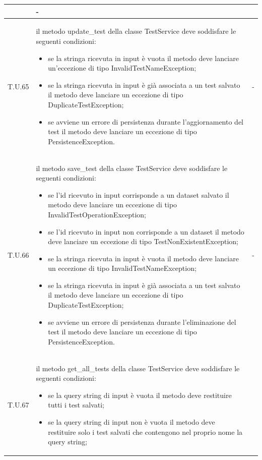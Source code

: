 \begin{tabularx}{\textwidth}{|c|X|c|}
\begin{itemize}
    \end{itemize} & - \\
    \hline 
    \label{tu:tu65} T.U.65 & il metodo update\_test della classe TestService deve soddisfare le seguenti condizioni:
    \begin{itemize}
        \item se la stringa ricevuta in input è vuota il metodo deve lanciare un'eccezione di tipo InvalidTestNameException;
        \item se la stringa ricevuta in input è già associata a un test salvato il metodo deve lanciare un eccezione di tipo DuplicateTestException;
        \item se avviene un errore di persistenza durante l'aggiornamento del test il metodo deve lanciare un eccezione di tipo PersistenceException.
    \end{itemize} & - \\
    \hline 
    \label{tu:tu66} T.U.66 & il metodo save\_test della classe TestService deve soddisfare le seguenti condizioni: 
    \begin{itemize}
        \item se l'id ricevuto in input corrisponde a un dataset salvato il metodo deve lanciare un eccezione di tipo InvalidTestOperationException;
        \item se l'id ricevuto in input non corrisponde a un dataset il metodo deve lanciare un eccezione di tipo TestNonExistentException;
        \item se la stringa ricevuta in input è vuota il metodo deve lanciare un eccezione di tipo InvalidTestNameException;
        \item se la stringa ricevuta in input è già associata a un test salvato il metodo deve lanciare un eccezione di tipo DuplicateTestException;
        \item se avviene un errore di persistenza durante l'eliminazione del test il metodo deve lanciare un eccezione di tipo PersistenceException.
    \end{itemize} & - \\
    \hline 
    \label{tu:tu67} T.U.67 & il metodo get\_all\_tests della classe TestService deve soddisfare le seguenti condizioni:
    \begin{itemize}
        \item se la query string di input è vuota il metodo deve restituire tutti i test salvati;
        \item se la query string di input non è vuota il metodo deve restituire solo i test salvati che contengono nel proprio nome la query string;

\end{itemize}
\end{tabularx}

